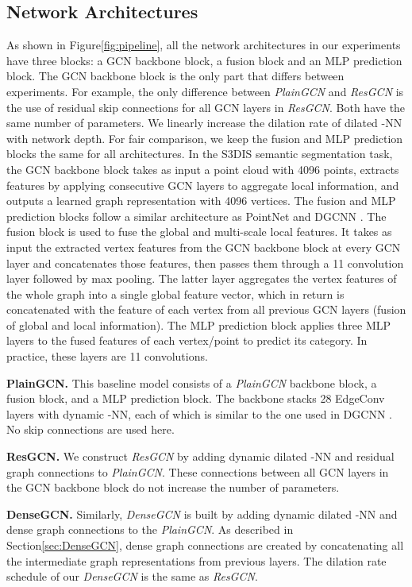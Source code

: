 \documentclass[10pt,twocolumn,letterpaper]{article}
\newcommand{\figLabel}{Figure\xspace}
\newcommand{\secLabel}{Section\xspace}
\newcommand{\mysection}[1]{\vspace{3pt}\noindent\textbf{#1.}}
\begin{document}
\subsection{Network Architectures}
As shown in \figLabel \ref{fig:pipeline}, all the network architectures in our experiments have three blocks: a GCN backbone block, a fusion block and an MLP prediction block. The GCN backbone block is the only part that differs between experiments. For example, the only difference between \emph{PlainGCN} and \emph{ResGCN} is the use of residual skip connections for all GCN layers in \emph{ResGCN}. Both have the same number of parameters. We linearly increase the dilation rate  of dilated -NN with network depth. For fair comparison, we keep the fusion and MLP prediction blocks the same for all architectures. In the S3DIS semantic segmentation task, the GCN backbone block takes as input a point cloud with 4096 points, extracts features by applying consecutive GCN layers to aggregate local information, and outputs a learned graph representation with 4096 vertices. The fusion and MLP prediction blocks follow a similar architecture as PointNet \cite{pc_qi2017pointnet} and DGCNN \cite{wang2018dynamic}. The fusion block is used to fuse the global and multi-scale local features. It takes as input the extracted vertex features from the GCN backbone block at every GCN layer and concatenates those features, then passes them through a 11 convolution layer followed by max pooling. The latter layer aggregates the vertex features of the whole graph into a single global feature vector, which in return is concatenated with the feature of each vertex from all previous GCN layers (fusion of global and local information). The MLP prediction block applies three MLP layers to the fused features of each vertex/point to predict its category. In practice, these layers are  11 convolutions.

\mysection{PlainGCN} This baseline model consists of a \emph{PlainGCN} backbone block, a fusion block, and a MLP prediction block. 
The backbone stacks 28 EdgeConv \cite{wang2018dynamic} layers with dynamic -NN, each of which is similar to the one used in DGCNN \cite{wang2018dynamic}. 
No skip connections are used here. 

\mysection{ResGCN} We construct \emph{ResGCN} by adding dynamic dilated -NN and residual graph connections to \emph{PlainGCN}. These connections between all GCN layers in the GCN backbone block do not increase the number of parameters.  

\mysection{DenseGCN} Similarly, \emph{DenseGCN} is built by adding dynamic dilated -NN and dense graph connections to the \emph{PlainGCN}. As described in \secLabel \ref{sec:DenseGCN}, dense graph connections are created by concatenating all the intermediate graph representations from previous layers. The dilation rate schedule of our \emph{DenseGCN} is the same as \emph{ResGCN}.
\end{document}
